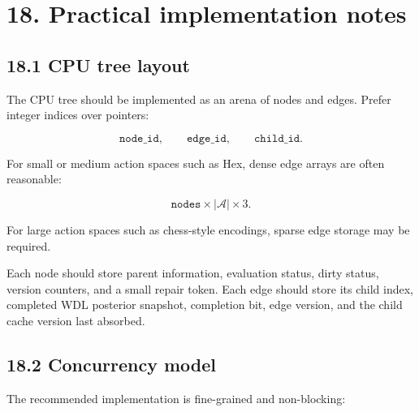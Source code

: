\documentclass[11pt]{article}
\newcommand{\Actions}{\mathcal{A}}
\begin{document}
\section*{18. Practical implementation notes}

\subsection*{18.1 CPU tree layout}

The CPU tree should be implemented as an arena of nodes and edges. Prefer
integer indices over pointers:

\[
\texttt{node\_id},
\qquad
\texttt{edge\_id},
\qquad
\texttt{child\_id}.
\]

For small or medium action spaces such as Hex, dense edge arrays are often
reasonable:

\[
\texttt{nodes} \times |\Actions| \times 3.
\]

For large action spaces such as chess-style encodings, sparse edge storage may
be required.

Each node should store parent information, evaluation status, dirty status,
version counters, and a small repair token. Each edge should store its child
index, completed WDL posterior snapshot, completion bit, edge version, and the
child cache version last absorbed.

\subsection*{18.2 Concurrency model}

The recommended implementation is fine-grained and non-blocking:
\end{document}

